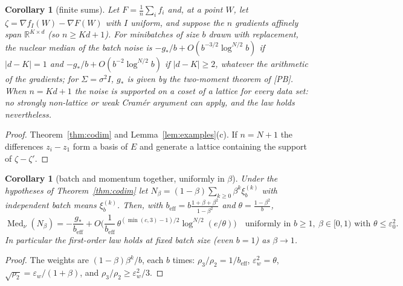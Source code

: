 \documentclass[10pt]{article}
\newtheorem{corollary}[theorem]{Corollary}
\theoremstyle{definition}
\theoremstyle{remark}
\newcommand{\R}{\mathbb{R}}
\newcommand{\Med}{\operatorname{Med}}
\newcommand{\ew}{\varepsilon_w}
\newcommand{\PB}{\textup{[PB]}}
\begin{document}
\begin{corollary}[finite sums]\label{cor:fs}
Let $F=\frac1n\sum_if_i$ and, at a point $W$, let $\zeta=\nabla f_I(W)-\nabla F(W)$ with $I$ uniform, and suppose the $n$
gradients affinely span $\R^{K\times d}$ (so $n\ge Kd+1$). For minibatches of size $b$ drawn with replacement, the
nuclear median of the batch noise is $-g_\ast/b+O(b^{-3/2}\log^{N/2}b)$ if $|d-K|=1$ and $-g_\ast/b+O(b^{-2}\log^{N/2}b)$ if
$|d-K|\ge2$, whatever the arithmetic of the gradients; for $\Sigma=\sigma^2I$, $g_\ast$ is given by the two-moment
theorem of \PB. When $n=Kd+1$ the noise is supported on a coset of a lattice for every data set: no strongly
non-lattice or weak Cram\'er argument can apply, and the law holds nevertheless.
\end{corollary}
\begin{proof}
Theorem~\ref{thm:codim} and Lemma~\ref{lem:examples}(c). If $n=N+1$ the differences $z_i-z_1$ form a basis of $E$ and
generate a lattice containing the support of $\zeta-\zeta'$.
\end{proof}

\begin{corollary}[batch and momentum together, uniformly in $\beta$]\label{cor:mom}
Under the hypotheses of Theorem~\ref{thm:codim} let $N_\beta=(1-\beta)\sum_{k\ge0}\beta^k\xi_b^{(k)}$ with independent
batch means $\xi_b^{(k)}$. Then, with $b_{\mathrm{eff}}=b\frac{1+\beta+\beta^2}{1-\beta^2}$ and $\theta=\frac{1-\beta^2}b$,
\[
\Med_\nu(N_\beta)=-\frac{g_\ast}{b_{\mathrm{eff}}}+O\Big(\frac{1}{b_{\mathrm{eff}}}\,\theta^{(\min(c,3)-1)/2}\log^{N/2}(e/\theta)\Big)
\quad\text{uniformly in }b\ge1,\ \beta\in[0,1)\text{ with }\theta\le\varepsilon_0^2 .
\]
In particular the first-order law holds at \emph{fixed} batch size (even $b=1$) as $\beta\to1$.
\end{corollary}
\begin{proof}
The weights are $(1-\beta)\beta^k/b$, each $b$ times: $\rho_3/\rho_2=1/b_{\mathrm{eff}}$, $\ew^2=\theta$,
$\sqrt{\rho_2}=\ew/(1+\beta)$, and $\rho_3/\rho_2\ge\ew^2/3$.
\end{proof}
\end{document}
